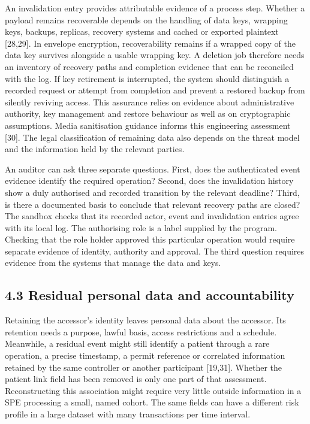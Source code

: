 \documentclass[5p,twocolumn]{elsarticle}
\begin{document}
An invalidation entry provides attributable evidence of a process step.
Whether a payload remains recoverable depends on the handling of data
keys, wrapping keys, backups, replicas, recovery systems and cached or
exported plaintext {[}28,29{]}. In envelope encryption, recoverability
remains if a wrapped copy of the data key survives alongside a usable
wrapping key. A deletion job therefore needs an inventory of recovery
paths and completion evidence that can be reconciled with the log. If
key retirement is interrupted, the system should distinguish a recorded
request or attempt from completion and prevent a restored backup from
silently reviving access. This assurance relies on evidence about
administrative authority, key management and restore behaviour as well
as on cryptographic assumptions. Media sanitisation guidance informs
this engineering assessment {[}30{]}. The legal classification of
remaining data also depends on the threat model and the information held
by the relevant parties.

An auditor can ask three separate questions. First, does the
authenticated event evidence identify the required operation? Second,
does the invalidation history show a duly authorised and recorded
transition by the relevant deadline? Third, is there a documented basis
to conclude that relevant recovery paths are closed? The sandbox checks
that its recorded actor, event and invalidation entries agree with its
local log. The authorising role is a label supplied by the program.
Checking that the role holder approved this particular operation would
require separate evidence of identity, authority and approval. The third
question requires evidence from the systems that manage the data and
keys.

\hypertarget{residual-personal-data-and-accountability}{%
\subsection{4.3 Residual personal data and
accountability}\label{residual-personal-data-and-accountability}}

Retaining the accessor's identity leaves personal data about the
accessor. Its retention needs a purpose, lawful basis, access
restrictions and a schedule. Meanwhile, a residual event might still
identify a patient through a rare operation, a precise timestamp, a
permit reference or correlated information retained by the same
controller or another participant {[}19,31{]}. Whether the patient link
field has been removed is only one part of that assessment.
Reconstructing this association might require very little outside
information in a SPE processing a small, named cohort. The same fields
can have a different risk profile in a large dataset with many
transactions per time interval.
\end{document}
